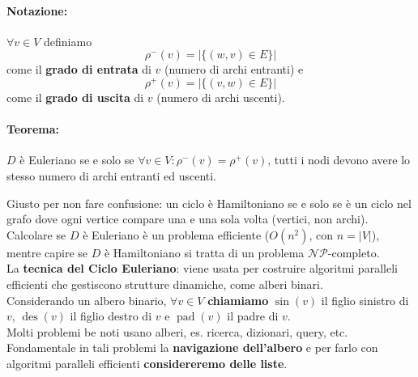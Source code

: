 \documentclass[11pt]{article}
\DeclareMathOperator{\des}{des}
\DeclareMathOperator{\pad}{pad}
\begin{document}
	\paragraph{Notazione:} $\forall v \in V$ definiamo 
	$$\rho^- (v) = |\{(w,v) \in E\}|$$
	come il \textbf{grado di entrata} di $v$ (numero di archi entranti) e 
	$$\rho^+ (v) = |\{(v,w) \in E\}|$$
	come il \textbf{grado di uscita} di $v$ (numero di archi uscenti).\\
	
	\paragraph{Teorema:} $D$ è Euleriano se e solo se $\forall v \in V: \rho^- (v) = \rho^+ (v)$, tutti i nodi devono avere lo stesso numero di archi entranti ed uscenti.\\
	
	\newpage
	
	Giusto per non fare confusione: un ciclo è Hamiltoniano se e solo se è un ciclo nel grafo dove ogni vertice compare una e una sola volta (vertici, non archi).\\
	
	Calcolare se $D$ è Euleriano è un problema efficiente ($O(n^2)$, con $n = |V|$), mentre capire se $D$ è Hamiltoniano si tratta di un problema $\mathcal{NP}$-completo.\\
	
	La \textbf{tecnica del Ciclo Euleriano}: viene usata per costruire algoritmi paralleli efficienti che gestiscono strutture dinamiche, come alberi binari.\\
	
	Considerando un albero binario, $\forall v \in V$ \textbf{chiamiamo} $\sin(v)$ il figlio sinistro di $v$, $\des (v)$ il figlio destro di $v$ e $\pad(v)$ il padre di $v$.\\
	
	Molti problemi be noti usano alberi, es. ricerca, dizionari, query, etc.\\
	
	Fondamentale in tali problemi la \textbf{navigazione dell'albero} e per farlo con algoritmi paralleli efficienti \textbf{considereremo delle liste}.\\
	
\end{document}
